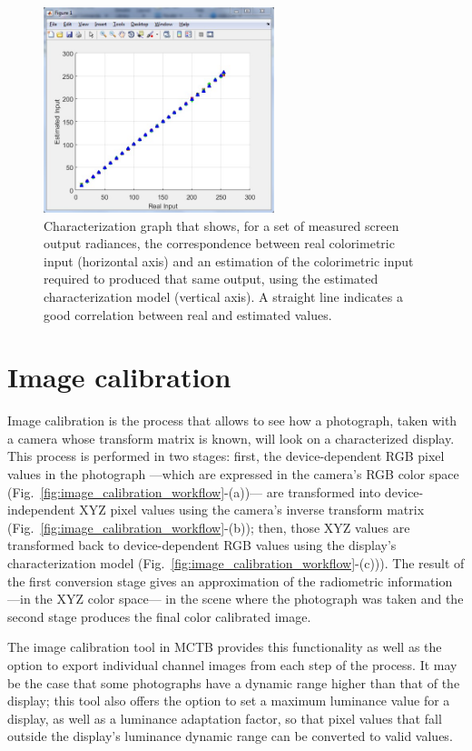 \documentclass[a4paper,12pt,oneside]{article}
\begin{document}
\begin{figure}[hp]
	\centering
	\includegraphics[width=0.6\textwidth]{images/display_graph.jpg}
	\caption{Characterization graph that shows, for a set of measured screen output radiances, the correspondence between real colorimetric input (horizontal axis) and an estimation of the colorimetric input required to produced that same output, using the estimated characterization model (vertical axis). A straight line indicates a good correlation between real and estimated values.}
	\label{fig:display_graph}
\end{figure}

\section{Image calibration}

Image calibration is the process that allows to see how a photograph, taken with a camera whose transform matrix is known, will look on a characterized display. This process is performed in two stages: first, the device-dependent RGB pixel values in the photograph ---which are expressed in the camera's RGB color space (Fig.~\ref{fig:image_calibration_workflow}-(a))--- are transformed into device-independent XYZ pixel values using the camera's inverse transform matrix (Fig.~\ref{fig:image_calibration_workflow}-(b)); then, those XYZ values are transformed back to device-dependent RGB values using the display's characterization model (Fig.~\ref{fig:image_calibration_workflow}-(c))). The result of the first conversion stage gives an approximation of the radiometric information ---in the XYZ color space--- in the scene where the photograph was taken and the second stage produces the final color calibrated image.

The image calibration tool in MCTB provides this functionality as well as the option to export individual channel images from each step of the process. It may be the case that some photographs have a dynamic range higher than that of the display; this tool also offers the option to set a maximum luminance value for a display, as well as a luminance adaptation factor, so that pixel values that fall outside the display's luminance dynamic range can be converted to valid values.
\end{document}

